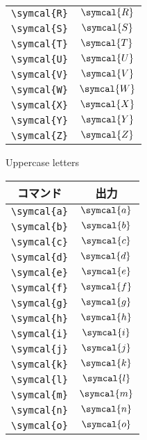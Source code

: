 \begin{figure}[htbp]
\begin{subfigure}{.5\textwidth}
\begin{tabular}{cc}
            \verb|\symcal{R}| & \(\symcal{R}\) \\
            \verb|\symcal{S}| & \(\symcal{S}\) \\
            \verb|\symcal{T}| & \(\symcal{T}\) \\
            \verb|\symcal{U}| & \(\symcal{U}\) \\
            \verb|\symcal{V}| & \(\symcal{V}\) \\
            \verb|\symcal{W}| & \(\symcal{W}\) \\
            \verb|\symcal{X}| & \(\symcal{X}\) \\
            \verb|\symcal{Y}| & \(\symcal{Y}\) \\
            \verb|\symcal{Z}| & \(\symcal{Z}\) \\
            \bottomrule
        \end{tabular}
        \caption{Uppercase letters}
        \label{fig:uppercase}
    \end{subfigure}%
    \begin{subfigure}{.5\textwidth}
        \centering
        \begin{tabular}{cc}
            \toprule
            コマンド          & 出力           \\
            \midrule
            \verb|\symcal{a}| & \(\symcal{a}\) \\
            \verb|\symcal{b}| & \(\symcal{b}\) \\
            \verb|\symcal{c}| & \(\symcal{c}\) \\
            \verb|\symcal{d}| & \(\symcal{d}\) \\
            \verb|\symcal{e}| & \(\symcal{e}\) \\
            \verb|\symcal{f}| & \(\symcal{f}\) \\
            \verb|\symcal{g}| & \(\symcal{g}\) \\
            \verb|\symcal{h}| & \(\symcal{h}\) \\
            \verb|\symcal{i}| & \(\symcal{i}\) \\
            \verb|\symcal{j}| & \(\symcal{j}\) \\
            \verb|\symcal{k}| & \(\symcal{k}\) \\
            \verb|\symcal{l}| & \(\symcal{l}\) \\
            \verb|\symcal{m}| & \(\symcal{m}\) \\
            \verb|\symcal{n}| & \(\symcal{n}\) \\
            \verb|\symcal{o}| & \(\symcal{o}\) \\

\end{tabular}
\end{subfigure}
\end{figure}
